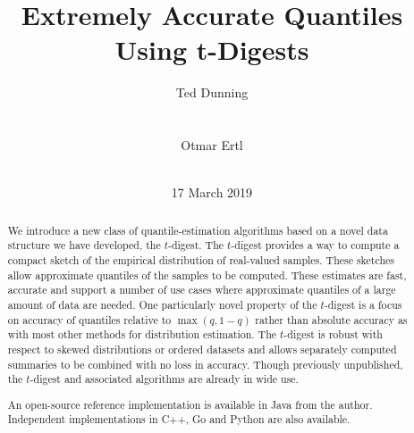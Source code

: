 \documentclass{vldb}
\begin{document}
\title{ Extremely Accurate Quantiles Using t-Digests}

\author{
%
%
\alignauthor
Ted Dunning\\
       \\
       \\
\alignauthor
Otmar Ertl\\
       \\
}
\date{17 March 2019}

\maketitle


\begin{abstract}
We introduce a new class of quantile-estimation algorithms based on a novel data structure we have developed, the $t$-digest. The $t$-digest  provides a way to compute a compact sketch of the empirical distribution of real-valued samples. These sketches allow approximate quantiles of the samples to be computed. These estimates are fast, accurate and support a number of use cases where approximate quantiles of a large amount of data are needed. One particularly novel property of the $t$-digest is a focus on  accuracy of quantiles  relative to $\max(q, 1-q)$ rather than absolute accuracy as with most other methods for distribution estimation.  The $t$-digest is robust with respect to skewed distributions or ordered datasets and allows separately computed summaries to be combined with no loss in accuracy. Though previously unpublished, the $t$-digest and associated algorithms are already in wide use.

An open-source reference implementation is available in Java from the author. Independent implementations in C++, Go and Python are also available.

\end{abstract}
\maketitle
\end{document}
